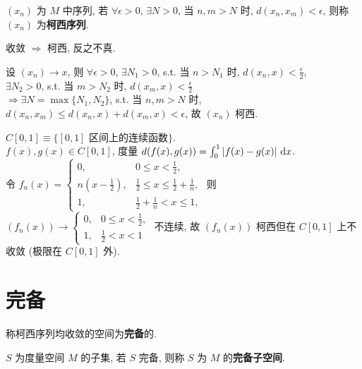 \documentclass{note}
\begin{document}
\begin{df}[柯西序列]
    $(x_n)$ 为 $M$ 中序列, 若 $\forall\epsilon>0$, $\exists N>0$, 当 $n,m>N$ 时, $d(x_n,x_m)<\epsilon$, 则称 $(x_n)$ 为\textbf{柯西序列}.
\end{df}

\begin{thm}
    收敛 $\Longrightarrow$ 柯西, 反之不真.
\end{thm}
\begin{pf}
    设 $(x_n)\rightarrow x$, 则 $\forall\epsilon>0$, $\exists N_1>0$, s.t. 当 $n>N_1$ 时, $d(x_n,x)<\frac{\epsilon}{2}$,\\
    $\exists N_2>0$, s.t. 当 $m>N_2$ 时, $d(x_m,x)<\frac{\epsilon}{2}$\\
    $\Longrightarrow\exists N=\max\{N_1,N_2\}$, s.t. 当 $n,m>N$ 时, $d(x_n,x_m)\leq d(x_n,x)+d(x_m,x)<\epsilon$, 故 $(x_n)$ 柯西.
\end{pf}

\begin{eg}
    $C[0,1]\equiv\{[0,1]\text{ 区间上的连续函数}\}$.\\
    $f(x),g(x)\in C[0,1]$, 度量 $d(f(x),g(x))=\int_0^1\left\lvert f(x)-g(x)\right\rvert\,\mathrm{d}x$.\\
    令 $f_n(x)=\left\{\begin{array}{ll}
        0,&0\leq x<\frac{1}{2},\\
        n(x-\frac{1}{2}),&\frac{1}{2}\leq x\leq\frac{1}{2}+\frac{1}{n},\\
        1,&\frac{1}{2}+\frac{1}{n}<x\leq 1,
    \end{array}\right.$ 则 $(f_n(x))\rightarrow\left\{\begin{array}{ll}
        0,&0\leq x<\frac{1}{2},\\
        1,&\frac{1}{2}<x<1
    \end{array}\right.$ 不连续, 故 $(f_n(x))$ 柯西但在 $C[0,1]$ 上不收敛 (极限在 $C[0,1]$ 外).
\end{eg}

\section{完备}
\begin{df}[完备]
    称柯西序列均收敛的空间为\textbf{完备}的.
\end{df}

\begin{df}[完备子空间]
    $S$ 为度量空间 $M$ 的子集, 若 $S$ 完备, 则称 $S$ 为 $M$ 的\textbf{完备子空间}.
\end{df}
\end{document}
